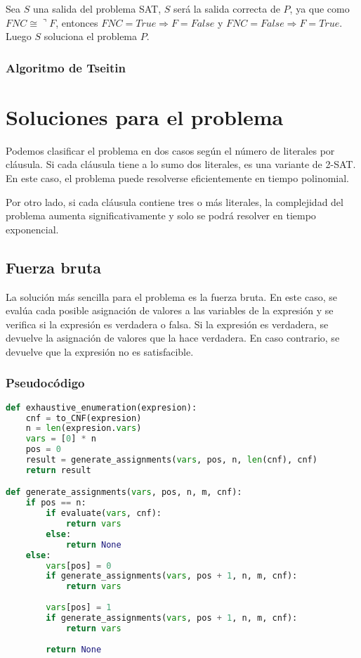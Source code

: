 \documentclass{article}
\begin{document}
            Sea $S$ una salida del problema SAT, $S$ será la salida correcta de $P$, ya que como $FNC \cong \urcorner F$, entonces 
            $FNC = True \Rightarrow  F = False$ y $FNC = False \Rightarrow F = True$. Luego $S$ soluciona el problema $P$.

        \subsubsection*{Algoritmo de Tseitin}
    
\section*{Soluciones para el problema}

    Podemos clasificar el problema en dos casos según el número 
    de literales por cláusula. Si cada cláusula tiene a lo sumo dos literales, es una variante de 2-SAT. 
    En este caso, el problema puede resolverse eficientemente en tiempo polinomial.

    Por otro lado, si cada cláusula contiene tres o más literales, la complejidad del problema 
    aumenta significativamente y solo se podrá resolver en tiempo exponencial.

    \subsection*{Fuerza bruta}

        La solución más sencilla para el problema es la fuerza bruta. En este caso, se evalúa 
        cada posible asignación de valores a las variables de la expresión y se verifica si la 
        expresión es verdadera o falsa. Si la expresión es verdadera, se devuelve la asignación 
        de valores que la hace verdadera. En caso contrario, se devuelve que la expresión no es 
        satisfacible.

        \subsubsection*{Pseudocódigo}

\begin{lstlisting}[language=Python]
def exhaustive_enumeration(expresion):
    cnf = to_CNF(expresion)
    n = len(expresion.vars)
    vars = [0] * n
    pos = 0
    result = generate_assignments(vars, pos, n, len(cnf), cnf)
    return result

def generate_assignments(vars, pos, n, m, cnf):
    if pos == n:
        if evaluate(vars, cnf):
            return vars
        else:
            return None
    else:
        vars[pos] = 0
        if generate_assignments(vars, pos + 1, n, m, cnf):
            return vars
        
        vars[pos] = 1
        if generate_assignments(vars, pos + 1, n, m, cnf):
            return vars
        
        return None
\end{lstlisting}
\end{document}
